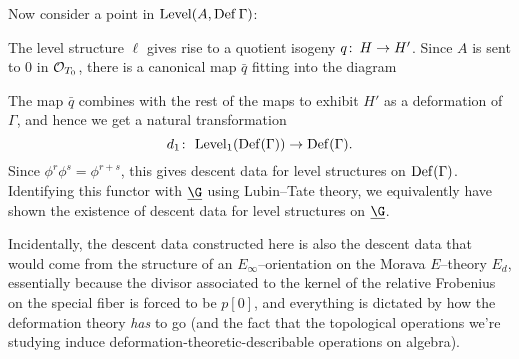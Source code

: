 Now consider a point in $\operatorname{Level}(A, \operatorname{Def} \Gamma)$:
\begin{center}
\end{center}
The level structure $\ell$ gives rise to a quotient isogeny $q\colon\thinspace H \to H'$.  Since $A$ is sent to $0$ in $\mathcal{O}_{T_0}$, there is a canonical map $\bar q$ fitting into the diagram
\begin{center}
\end{center}
The map $\bar q$ combines with the rest of the maps to exhibit $H'$ as a deformation of $\Gamma$, and hence we get a natural transformation \[d_1\colon\thinspace \operatorname{Level}_1(\operatorname{Def}(\Gamma)) \to \operatorname{Def}(\Gamma).\]  Since $\phi^r \phi^s = \phi^{r+s}$, this gives descent data for level structures on $\operatorname{Def}(\Gamma)$.  Identifying this functor with $\underline{\G}$ using Lubin--Tate theory, we equivalently have shown the existence of descent data for level structures on $\underline{\G}$.

Incidentally, the descent data constructed here is also the descent data that would come from the structure of an $E_\infty$--orientation on the Morava $E$--theory $E_d$, essentially because the divisor associated to the kernel of the relative Frobenius on the special fiber is forced to be $p[0]$, and everything is dictated by how the deformation theory \emph{has} to go (and the fact that the topological operations we're studying induce deformation-theoretic-describable operations on algebra).
















